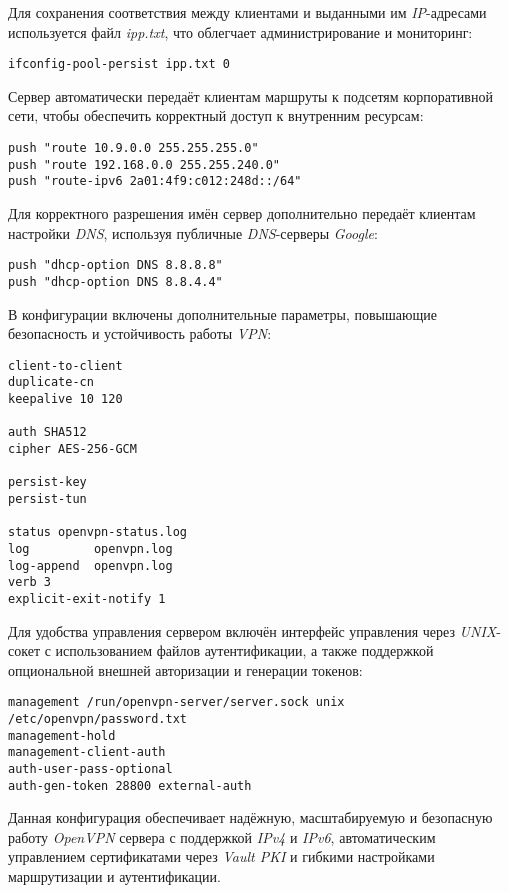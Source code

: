 Для сохранения соответствия между клиентами и выданными им \textit{IP}-адресами используется файл \textit{ipp.txt}, что облегчает администрирование и мониторинг:

\begin{lstlisting}
ifconfig-pool-persist ipp.txt 0
\end{lstlisting}

Сервер автоматически передаёт клиентам маршруты к подсетям корпоративной сети, чтобы обеспечить корректный доступ к внутренним ресурсам:

\begin{lstlisting}
push "route 10.9.0.0 255.255.255.0"
push "route 192.168.0.0 255.255.240.0"
push "route-ipv6 2a01:4f9:c012:248d::/64"
\end{lstlisting}

Для корректного разрешения имён сервер дополнительно передаёт клиентам настройки \textit{DNS}, используя публичные \textit{DNS}-серверы \textit{Google}:

\begin{lstlisting}
push "dhcp-option DNS 8.8.8.8"
push "dhcp-option DNS 8.8.4.4"
\end{lstlisting}

В конфигурации включены дополнительные параметры, повышающие безопасность и устойчивость работы \textit{VPN}:

\begin{lstlisting}
client-to-client
duplicate-cn
keepalive 10 120

auth SHA512
cipher AES-256-GCM

persist-key
persist-tun

status openvpn-status.log
log         openvpn.log
log-append  openvpn.log
verb 3
explicit-exit-notify 1
\end{lstlisting}

Для удобства управления сервером включён интерфейс управления через \textit{UNIX}-сокет с использованием файлов аутентификации, а также поддержкой опциональной внешней авторизации и генерации токенов:

\begin{lstlisting}
management /run/openvpn-server/server.sock unix /etc/openvpn/password.txt
management-hold
management-client-auth
auth-user-pass-optional
auth-gen-token 28800 external-auth
\end{lstlisting}

Данная конфигурация обеспечивает надёжную, масштабируемую и безопасную работу \textit{OpenVPN} сервера с поддержкой \textit{IPv4} и \textit{IPv6}, автоматическим управлением сертификатами через \textit{Vault PKI} и гибкими настройками маршрутизации и аутентификации.

